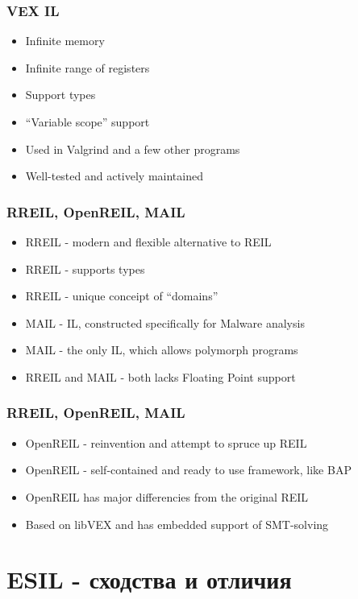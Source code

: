 \documentclass[10pt,pdf,utf8,english,compress,hyperref={unicode}]{beamer}
\begin{document}
\begin{frame}[fragile]
  \frametitle{VEX IL}
  \begin{itemize}
  \item Infinite memory
  \item Infinite range of registers
  \item Support types
  \item ``Variable scope'' support
  \item Used in Valgrind and a few other programs
  \item Well-tested and actively maintained
  \end{itemize}
\end{frame}

\begin{frame}[fragile]
  \frametitle{RREIL, OpenREIL, MAIL}
  \begin{itemize}
  \item RREIL  - modern and flexible alternative to REIL
  \item RREIL - supports types
  \item RREIL - unique conceipt of ``domains''
  \item MAIL - IL, constructed specifically for Malware analysis
  \item MAIL - the only IL, which allows polymorph programs
  \item RREIL and MAIL - both lacks Floating Point support
  \end{itemize}
\end{frame}

\begin{frame}[fragile]
  \frametitle{RREIL, OpenREIL, MAIL}
  \begin{itemize}
  \item OpenREIL  - reinvention and attempt to spruce up REIL
  \item OpenREIL - self-contained and ready to use framework, like BAP
  \item OpenREIL has major differencies from the original REIL
  \item Based on libVEX and has embedded support of SMT-solving
  \end{itemize}
\end{frame}


\section{ESIL - сходства и отличия}
\end{document}
